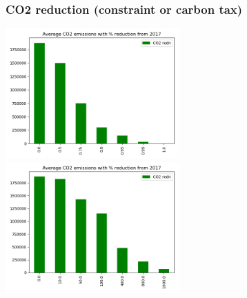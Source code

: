 \documentclass[xcolor=dvipsnames]{beamer}
\begin{document}
\begin{frame}
  \frametitle{CO2 reduction (constraint or carbon tax)}

    \includegraphics[width=0.5\textwidth]{includes/TotalCarbonSinglev20.png}
    \includegraphics[width=0.5\textwidth]{includes/TotalCarbonincrv20.png}

\end{frame}
\end{document}
